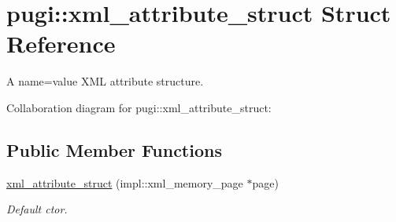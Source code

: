 \hypertarget{structpugi_1_1xml__attribute__struct}{}\section{pugi\+:\+:xml\+\_\+attribute\+\_\+struct Struct Reference}
\label{structpugi_1_1xml__attribute__struct}


A \textquotesingle{}name=value\textquotesingle{} X\+M\+L attribute structure.  




Collaboration diagram for pugi\+:\+:xml\+\_\+attribute\+\_\+struct\+:
\subsection*{Public Member Functions}
\begin{DoxyCompactItemize}
\item 
\hypertarget{structpugi_1_1xml__attribute__struct_a57bb21cb72613e746a659efdd6425b94}{}\hyperlink{structpugi_1_1xml__attribute__struct_a57bb21cb72613e746a659efdd6425b94}{xml\+\_\+attribute\+\_\+struct} (impl\+::xml\+\_\+memory\+\_\+page $\ast$page)\label{structpugi_1_1xml__attribute__struct_a57bb21cb72613e746a659efdd6425b94}

\begin{DoxyCompactList}\small\item\em Default ctor. \end{DoxyCompactList}\end{DoxyCompactItemize}
